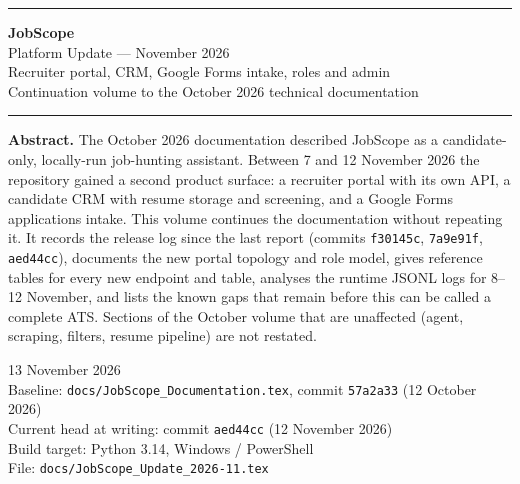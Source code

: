 \documentclass[11pt,a4paper]{article}
\newcommand{\file}[1]{\texttt{\small #1}}
\begin{document}
\begin{titlepage}
  \centering
  \vspace*{1.7cm}
  {\color{indigo}\rule{\textwidth}{2pt}}

  \vspace{0.8cm}
  {\fontsize{30}{36}\selectfont\bfseries\color{indigo} JobScope}\\[6pt]
  {\Large Platform Update --- November 2026}\\[2pt]
  {\large Recruiter portal, CRM, Google Forms intake, roles and admin}\\[2pt]
  {\large Continuation volume to the October 2026 technical documentation}

  \vspace{0.8cm}
  {\color{indigo}\rule{\textwidth}{2pt}}

  \vspace{1.9cm}
  \begin{minipage}{0.86\textwidth}
    \small
    \textbf{Abstract.} The October 2026 documentation described JobScope as a
    candidate-only, locally-run job-hunting assistant. Between 7 and 12
    November 2026 the repository gained a second product surface: a recruiter
    portal with its own API, a candidate CRM with resume storage and screening,
    and a Google Forms applications intake. This volume continues the
    documentation without repeating it. It records the release log since the
    last report (commits \texttt{f30145c}, \texttt{7a9e91f}, \texttt{aed44cc}),
    documents the new portal topology and role model, gives reference tables
    for every new endpoint and table, analyses the runtime JSONL logs for
    8--12 November, and lists the known gaps that remain before this can be
    called a complete ATS. Sections of the October volume that are unaffected
    (agent, scraping, filters, resume pipeline) are not restated.
  \end{minipage}

  \vfill
  {\small 13 November 2026 \\[2pt]
   Baseline: \file{docs/JobScope\_Documentation.tex}, commit \texttt{57a2a33}
   (12 October 2026)\\[2pt]
   Current head at writing: commit \texttt{aed44cc} (12 November 2026)\\[2pt]
   Build target: Python 3.14, Windows / PowerShell \\[2pt]
   File: \file{docs/JobScope\_Update\_2026-11.tex}}
\end{titlepage}
\end{document}
